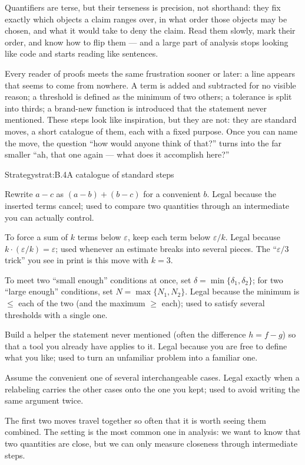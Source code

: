 \documentclass[a4paper,12pt,oneside]{memoir}
\begin{document}
Quantifiers are terse, but their terseness is precision, not shorthand: they fix exactly which objects a claim ranges over, in what order those objects may be chosen, and what it would take to deny the claim. Read them slowly, mark their order, and know how to flip them — and a large part of analysis stops looking like code and starts reading like sentences.


Every reader of proofs meets the same frustration sooner or later: a line appears that seems to come from nowhere. A term is added and subtracted for no visible reason; a threshold is defined as the minimum of two others; a tolerance is split into thirds; a brand-new function is introduced that the statement never mentioned. These steps look like inspiration, but they are not: they are standard moves, a short catalogue of them, each with a fixed purpose. Once you can name the move, the question “how would anyone think of that?” turns into the far smaller “ah, that one again — what does it accomplish here?”

\begin{envstrategy}{Strategy}{strat:B.4}{A catalogue of standard steps}
\begin{bulletsteps}
  \item {} Rewrite \(a - c\) as \((a - b) + (b - c)\) for a convenient \(b\). Legal because the inserted terms cancel; used to compare two quantities through an intermediate you can actually control.
  \item {} To force a sum of \(k\) terms below \(\varepsilon\), keep each term below \(\varepsilon/k\). Legal because \(k \cdot (\varepsilon/k) = \varepsilon\); used whenever an estimate breaks into several pieces. The “\(\varepsilon/3\) trick” you see in print is this move with \(k = 3\).
  \item {} To meet two “small enough” conditions at once, set \(\delta = \min\{\delta_1, \delta_2\}\); for two “large enough” conditions, set \(N = \max\{N_1, N_2\}\). Legal because the minimum is \(\le\) each of the two (and the maximum \(\ge\) each); used to satisfy several thresholds with a single one.
  \item {} Build a helper the statement never mentioned (often the difference \(h = f - g\)) so that a tool you already have applies to it. Legal because you are free to define what you like; used to turn an unfamiliar problem into a familiar one.
  \item {} Assume the convenient one of several interchangeable cases. Legal exactly when a relabeling carries the other cases onto the one you kept; used to avoid writing the same argument twice.
\end{bulletsteps}
\end{envstrategy}
The first two moves travel together so often that it is worth seeing them combined. The setting is the most common one in analysis: we want to know that two quantities are close, but we can only measure closeness through intermediate steps.
\end{document}
